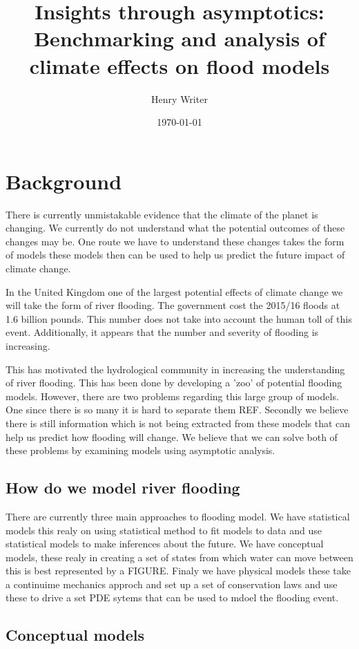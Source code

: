 \documentclass[11pt]{article}
\title{\Huge\textbf{Insights through asymptotics:}\\
 \LARGE Benchmarking and analysis of climate effects on flood models}
\author{Henry Writer }
\date{\today}
\begin{document}
\maketitle

\section{Background}

There is currently unmistakable evidence that the climate of the planet is changing. We currently do not understand what the potential outcomes of these changes may be. One route we have to understand these changes takes the form of models these models then can be used to help us predict the future impact of climate change.

In the United Kingdom one of the largest potential effects of climate change we will take the form of river flooding. The government cost the 2015/16 floods at 1.6 billion pounds. This number does not take into account the human toll of this event. Additionally, it appears that the number and severity of flooding is increasing. 

This has motivated the hydrological community in increasing the understanding of river flooding. This has been done by developing a 'zoo' of potential flooding models. However, there are two problems regarding this large group of models. One since there is so many it is hard to separate them REF. 
Secondly we believe there is still information which is not being extracted from these models that can help us predict how flooding will change. We believe that we can solve both of these problems by examining models using asymptotic analysis.

\subsection{How do we model river flooding}
There are currently three main approaches to flooding model. We have statistical models this realy on using statistical method to fit models to data and use statistical models to make inferences about the future. 
We have conceptual models, these realy in creating a set of states from which water can move between this is best represented by a FIGURE. 
Finaly we have physical models these take a continuime mechanics approch and set up a set of conservation laws and use these to drive a set PDE sytems that can be used to mdoel the flooding event.

\subsection*{Conceptual models}
\end{document}
